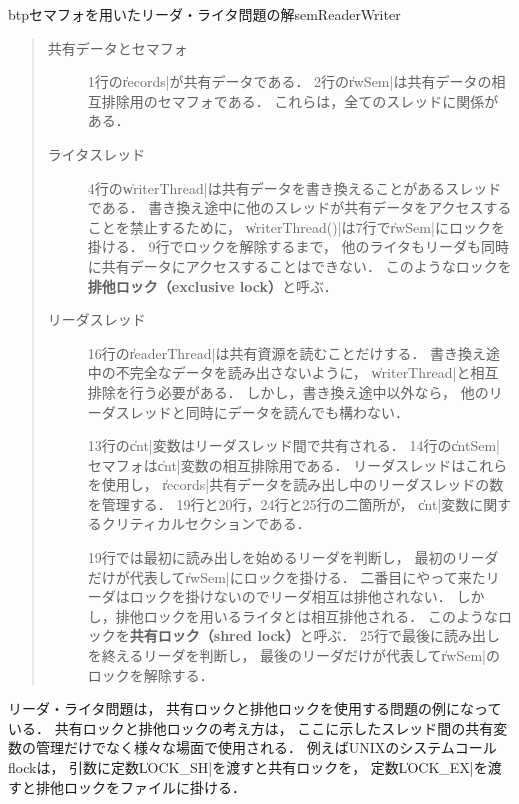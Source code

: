 \begin{myfig}{btp}{セマフォを用いたリーダ・ライタ問題の解}{semReaderWriter}

\end{myfig}

\begin{quote}
\begin{description}
\item [共有データとセマフォ]
1行の\|records|が共有データである．
2行の\|rwSem|は共有データの相互排除用のセマフォである．
これらは，全てのスレッドに関係がある．

\item [ライタスレッド]
4行の\|writerThread|は共有データを書き換えることがあるスレッドである．
書き換え途中に他のスレッドが共有データをアクセスすることを禁止するために，
\|writerThread()|は7行で\|rwSem|にロックを掛ける．
9行でロックを解除するまで，
他のライタもリーダも同時に共有データにアクセスすることはできない．
このようなロックを{\bf 排他ロック（exclusive lock）}と呼ぶ．

\item [リーダスレッド]
16行の\|readerThread|は共有資源を読むことだけする．
書き換え途中の不完全なデータを読み出さないように，
\|writerThread|と相互排除を行う必要がある．
しかし，書き換え途中以外なら，
他のリーダスレッドと同時にデータを読んでも構わない．

13行の\|cnt|変数はリーダスレッド間で共有される．
14行の\|cntSem|セマフォは\|cnt|変数の相互排除用である．
リーダスレッドはこれらを使用し，
\|records|共有データを読み出し中のリーダスレッドの数を管理する．
19行と20行，24行と25行の二箇所が，
\|cnt|変数に関するクリティカルセクションである．

19行では最初に読み出しを始めるリーダを判断し，
最初のリーダだけが代表して\|rwSem|にロックを掛ける．
二番目にやって来たリーダはロックを掛けないのでリーダ相互は排他されない．
しかし，排他ロックを用いるライタとは相互排他される．
このようなロックを{\bf 共有ロック（shred lock）}と呼ぶ．
25行で最後に読み出しを終えるリーダを判断し，
最後のリーダだけが代表して\|rwSem|のロックを解除する．
\end{description}
\end{quote}

リーダ・ライタ問題は，
共有ロックと排他ロックを使用する問題の例になっている．
共有ロックと排他ロックの考え方は，
ここに示したスレッド間の共有変数の管理だけでなく様々な場面で使用される．
例えばUNIXのシステムコールflockは，
引数に定数\|LOCK_SH|を渡すと共有ロックを，
定数\|LOCK_EX|を渡すと排他ロックをファイルに掛ける．

